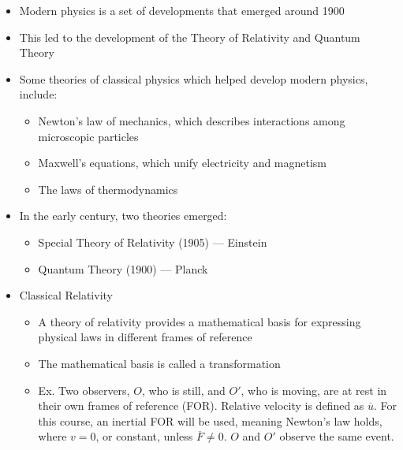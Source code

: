 \begin{itemize}

  \item Modern physics is a set of developments that emerged around 1900

  \item This led to the development of the Theory of Relativity and Quantum Theory

  \item Some theories of classical physics which helped develop modern physics, include:

    \begin{itemize}

      \item Newton's law of mechanics, which describes interactions among microscopic particles

      \item Maxwell's equations, which unify electricity and magnetism

      \item The laws of thermodynamics

    \end{itemize}

  \item In the early  century, two theories emerged:

    \begin{itemize}

      \item Special Theory of Relativity (1905) — Einstein

      \item Quantum Theory (1900) — Planck

    \end{itemize}

  \item Classical Relativity

    \begin{itemize}

      \item A theory of relativity provides a mathematical basis for expressing physical laws in different frames of reference

      \item The mathematical basis is called a transformation

      \item Ex. Two observers, $O$, who is still, and $O'$, who is moving, are at rest in their own frames of reference (FOR). Relative velocity is defined as $\overline{u}$. For this course, an inertial FOR will be used, meaning Newton's law holds, where $v=0$, or constant, unless $\overline{F}\neq0$. $O$ and $O'$ observe the same event.


\end{itemize}
\end{itemize}
